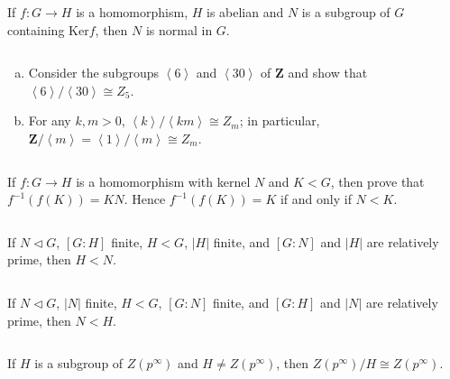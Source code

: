 $$ $$

\begin{ex}
    If $f:G\to H$ is a homomorphism, $H$ is abelian and $N$ is a subgroup of $G$ containing $\mathrm{Ker}f$, then $N$ is normal in $G$.
\end{ex}

$$ $$

\begin{ex}
    \begin{enumerate}[(a)]
        \item Consider the subgroups $\left\langle 6\right\rangle$ and $\left\langle 30\right\rangle$ of $\mathbf{Z}$ and show that $\left\langle 6\right\rangle /\left\langle 30\right\rangle\cong Z_{5}$.
        \item For any $k,m>0$, $\left\langle k\right\rangle /\left\langle km\right\rangle\cong Z_{m}$; in particular, $\mathbf{Z}/\left\langle m\right\rangle=\left\langle 1\right\rangle /\left\langle m\right\rangle\cong Z_{m}$.
    \end{enumerate}
\end{ex}

$$ $$

\begin{ex}
    If $f: G \to H$ is a homomorphism with kernel $N$ and $K<G$, then prove that $f^{-1}(f(K))=KN$. Hence $f^{-1}(f(K))=K$ if and only if $N<K$.
\end{ex}

$$ $$

\begin{ex}
    If $N\lhd G$, $\left[G:H\right]$ finite, $H<G$, $\left| H \right| $ finite, and $\left[G:N\right]$ and $\left| H \right| $ are relatively prime, then $H<N$.
\end{ex}

$$ $$

\begin{ex}
    If $N\lhd G$, $\left| N \right|$ finite, $H<G$, $\left[G:N\right] $ finite, and $\left[G:H\right]$ and $\left| N \right| $ are relatively prime, then $N<H$.
\end{ex}

$$ $$

\begin{ex}
    If $H$ is a subgroup of $Z(p^{\infty})$ and $H\neq Z(p^{\infty})$, then $Z(p^{\infty}) /H\cong Z(p^{\infty})$.
\end{ex}